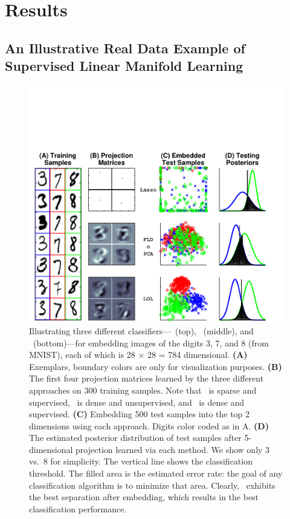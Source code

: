 \documentclass[10pt]{article}
\begin{document}
\section*{Results}

\subsection*{An Illustrative Real Data Example of Supervised Linear Manifold Learning}



\begin{figure}
\centering %
\includegraphics[width=0.7\linewidth,trim=1cm 0cm 0cm 4.0cm,clip=true]{../Figs/mnist}
\caption{
Illustrating three different classifiers---~(top), ~(middle), and \Lol~(bottom)---for embedding images of the digits 3, 7, and 8 (from MNIST), each of which is 28 $\times$ 28 = 784 dimensional.
\textbf{(A)} Exemplars, boundary colors are only for visualization purposes.
\textbf{(B)} The first four projection matrices learned by the three different approaches on 300 training samples. Note that ~is sparse and supervised, \Pca~is dense and unsupervised, and \Lol~is dense and supervised.
\textbf{(C)} Embedding 500 test samples into the top 2 dimensions using each approach.  Digits color coded as in A.
\textbf{(D)}  The estimated posterior distribution of test samples after
5-dimensional projection learned via each method.
We show only 3 vs.~8 for simplicity.
The vertical line shows the classification threshold.
The filled area is the estimated error rate: the goal of any classification algorithm is to minimize that area.
Clearly, \Lol~exhibits the best separation after embedding, which results in the best classification performance.
}
\label{f:mnist}
\end{figure}
\end{document}
